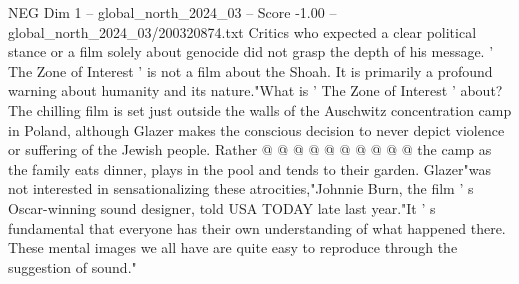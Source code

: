 \begin{textsample}{NEG Dim 1 – global\_north\_2024\_03 – Score -1.00 – global\_north\_2024\_03/200320874.txt}
Critics who expected a clear political stance or a film solely about genocide did not grasp the depth of his message. ' The Zone of Interest ' is not a film about the Shoah.
It is primarily a profound warning about humanity and its nature."What is ' The Zone of Interest ' about?
The chilling film is set just outside the walls of the Auschwitz concentration camp in Poland, although Glazer makes the conscious decision to never depict violence or suffering of the Jewish people.
Rather @ @ @ @ @ @ @ @ @ @ the camp as the family eats dinner, plays in the pool and tends to their garden.
Glazer"was not interested in sensationalizing these atrocities,"Johnnie Burn, the film ' s Oscar-winning sound designer, told USA TODAY late last year."It ' s fundamental that everyone has their own understanding of what happened there.
These mental images we all have are quite easy to reproduce through the suggestion of sound."

\end{textsample}
